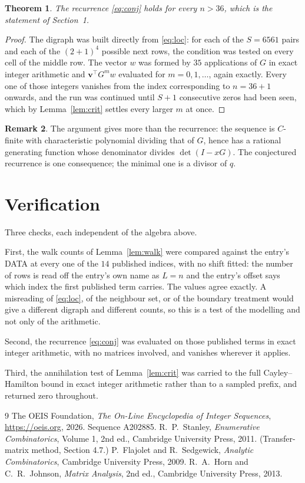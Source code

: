 \documentclass[11pt,a4paper]{article}
\theoremstyle{plain}
\newtheorem{theorem}{Theorem}
\theoremstyle{definition}
\newtheorem{remark}[theorem]{Remark}
\begin{document}
\begin{theorem}
The recurrence \eqref{eq:conj} holds for every $n>36$, which is the statement of
Section~1.
\end{theorem}

\begin{proof}
The digraph was built directly from \eqref{eq:loc}: for each of the $S=6561$ pairs and each
of the $(2+1)^{4}$ possible next rows, the condition was tested on every cell of
the middle row. The vector $w$ was formed by $35$ applications of $G$ in exact integer
arithmetic and $\mathbf{v}^{\!\top}G^{m}w$ evaluated for $m=0,1,\dots$, again exactly.
Every one of those integers vanishes from the index corresponding to $n=36+1$ onwards,
and the run was continued until $S+1$ consecutive zeros had been seen, which by
Lemma~\ref{lem:crit} settles every larger $m$ at once.
\end{proof}

\begin{remark}
The argument gives more than the recurrence: the sequence is $C$-finite with characteristic
polynomial dividing that of $G$, hence has a rational generating function whose denominator
divides $\det(I-xG)$. The conjectured recurrence is one consequence; the minimal one is a
divisor of $q$.
\end{remark}

\section{Verification}

Three checks, each independent of the algebra above.

First, the walk counts of Lemma~\ref{lem:walk} were compared against the entry's DATA at
every one of the $14$ published indices, with no shift fitted: the number of rows is
read off the entry's own name as $L=n$ and the entry's offset says which index the first
published term carries. The values agree exactly. A misreading of \eqref{eq:loc}, of the
neighbour set, or of the boundary treatment would give a different digraph and different
counts, so this is a test of the modelling and not only of the arithmetic.

Second, the recurrence \eqref{eq:conj} was evaluated on those published terms in exact
integer arithmetic, with no matrices involved, and vanishes wherever it applies.

Third, the annihilation test of Lemma~\ref{lem:crit} was carried to the full
Cayley--Hamilton bound in exact integer arithmetic rather than to a sampled prefix, and
returned zero throughout.

\begin{thebibliography}{9}
 The OEIS Foundation, \emph{The On-Line Encyclopedia of Integer
Sequences}, \url{https://oeis.org}, 2026. Sequence A202885.
 R.~P.~Stanley, \emph{Enumerative Combinatorics}, Volume 1, 2nd ed.,
Cambridge University Press, 2011. (Transfer-matrix method, Section 4.7.)
 P.~Flajolet and R.~Sedgewick, \emph{Analytic Combinatorics}, Cambridge
University Press, 2009.
 R.~A.~Horn and C.~R.~Johnson, \emph{Matrix Analysis}, 2nd ed., Cambridge
University Press, 2013.
\end{thebibliography}
\end{document}
